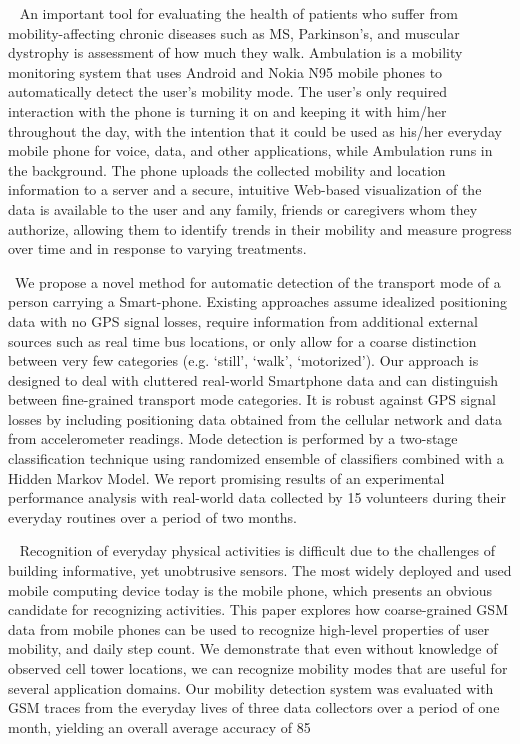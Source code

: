 ~\cite{5283030}
An important tool for evaluating the health of patients who suffer from mobility-affecting chronic diseases such as MS, Parkinson's, and muscular dystrophy is assessment of how much they walk. Ambulation is a mobility monitoring system that uses Android and Nokia N95 mobile phones to automatically detect the user's mobility mode. The user's only required interaction with the phone is turning it on and keeping it with him/her throughout the day, with the intention that it could be used as his/her everyday mobile phone for voice, data, and other applications, while Ambulation runs in the background. The phone uploads the collected mobility and location information to a server and a secure, intuitive Web-based visualization of the data is available to the user and any family, friends or caregivers whom they authorize, allowing them to identify trends in their mobility and measure progress over time and in response to varying treatments.

~\cite{6460199}We propose a novel method for automatic detection of the transport mode of a person carrying a Smart-phone. Existing approaches assume idealized positioning data with no GPS signal losses, require information from additional external sources such as real time bus locations, or only allow for a coarse distinction between very few categories (e.g. `still', `walk', `motorized'). Our approach is designed to deal with cluttered real-world Smartphone data and can distinguish between fine-grained transport mode categories. It is robust against GPS signal losses by including positioning data obtained from the cellular network and data from accelerometer readings. Mode detection is performed by a two-stage classification technique using randomized ensemble of classifiers combined with a Hidden Markov Model. We report promising results of an experimental performance analysis with real-world data collected by 15 volunteers during their everyday routines over a period of two months.

~\cite{sohn2006mobility}
Recognition of everyday physical activities is difficult due to the challenges of building informative, yet unobtrusive sensors. The most widely deployed and used mobile computing device today is the mobile phone, which presents an obvious candidate for recognizing activities. This paper explores how coarse-grained GSM data from mobile phones can be used to recognize high-level properties of user mobility, and daily step count. We demonstrate that even without knowledge of observed cell tower locations, we can recognize mobility modes that are useful for several application domains. Our mobility detection system was evaluated with GSM traces from the everyday lives of three data collectors over a period of one month, yielding an overall average accuracy of 85%

